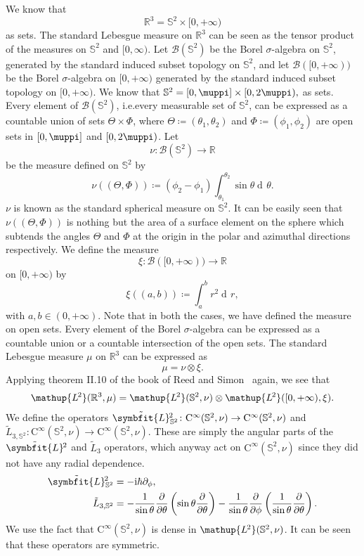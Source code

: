 \documentclass[12pt, a4 paper]{article}
\theoremstyle{definition}
\newcommand{\ltwo}{\mathup{L\kern-0.7pt^2}}
\newcommand{\rthree}{\mathbb{R}^3}
\newcommand{\rr}{\mathbb{R}}
\renewcommand{\i}{\mathrm{i}}
\renewcommand{\pi}{\muppi}
\newcommand{\lvecsquare}{\tilde{\symbfit{L}}\kern-1pt^2}
\newcommand{\der}{\operatorname{d\!}{}}
\begin{document}
	We know that \[\rthree = \mathbb{S}^2 \times [0, +\infty)\] as sets. The standard Lebesgue measure on $\rthree$ can be seen as the tensor product of the measures on $\mathbb{S}^2$ and $[0, \infty)$. Let $\mathcal{B}(\mathbb{S}^2)$ be the Borel $\sigma$-algebra on $\mathbb{S}^2$, generated by the standard induced subset topology on $\mathbb{S}^2$, and let $\mathcal{B}([0,+\infty))$ be the Borel $\sigma$-algebra on $[0, +\infty)$ generated by the standard induced subset topology on $[0, +\infty)$. We know that $\mathbb{S}^2 = [0, \pi] \times [0, 2\pi),$ as sets. Every element of $\mathcal{B}(\mathbb{S}^2)$, i.e.\@ every measurable set of $\mathbb{S}^2$, can be expressed as a countable union of sets $\Theta \times \Phi$, where $\Theta \coloneq (\theta_1, \theta_2)$ and $\Phi \coloneq (\phi_1, \phi_2)$ are open sets in $[0, \pi]$ and $[0, 2\pi)$. Let
	\[
		\nu \colon \mathcal{B}(\mathbb{S}^2) \rightarrow \rr
	\]
	be the measure defined on $\mathbb{S}^2$ by
	\[
	    \nu((\Theta, \Phi)) \coloneq (\phi_2 - \phi_1) \int_{\theta_1}^{\theta_2}\sin{\theta}\der \theta.
	\]
	$\nu$ is known as the standard spherical measure on $\mathbb{S}^2$. It can be easily seen that $\nu((\Theta, \Phi))$ is nothing but the area of a surface element on the sphere which subtends the angles $\Theta$ and $\Phi$ at the origin in the polar and azimuthal directions respectively. We define the measure
	\[
		\xi \colon \mathcal{B}([0, +\infty)) \rightarrow \rr
	\]
	on $[0, +\infty)$ by
	\[
		\xi((a, b)) \coloneq \int_a^b r^2\! \der r,
	\]
	with $a, b \in (0, +\infty)$. Note that in both the cases, we have defined the measure on open sets. Every element of the Borel $\sigma$-algebra can be expressed as a countable union or a countable intersection of the open sets. The standard Lebesgue measure $\mu$ on $\rthree$ can be expressed as
	\[
		\mu = \nu \otimes \xi.
	\]
	Applying theorem II.10 of the book of Reed and Simon~\cite[p.~52]{Reed} again, we see that
	\begin{align}
		\ltwo(\rthree, \mu) = \ltwo(\mathbb{S}^2, \nu) \otimes \ltwo([0, +\infty), \xi).
	\end{align}
	We define the operators $\lvecsquare_{\,\mathbb{S}^2} \colon \mathrm{C}^\infty(\mathbb{S}^2, \nu) \rightarrow \mathrm{C}^\infty(\mathbb{S}^2, \nu)$ and $\tilde{L}_{3, \mathbb{S}^2} \colon \mathrm{C}^\infty(\mathbb{S}^2, \nu) \rightarrow \mathrm{C}^\infty(\mathbb{S}^2, \nu)$. These are simply the angular parts of the $\lvecsquare$ and $\tilde{L}_3$ operators, which anyway act on $\mathrm{C}^\infty(\mathbb{S}^2, \nu)$ since they did not have any radial dependence.
	\begin{align*}
	    \lvecsquare_{\,\mathbb{S}^2} &= -\i\hbar\partial_\phi,\\
		\tilde{L}_{3, \mathbb{S}^2}  &= -\frac{1}{\sin{\theta}}\frac{\partial}{\partial \theta}\left(\sin{\theta}\frac{\partial}{\partial\theta}\right) -\frac{1}{\sin{\theta}}\frac{\partial}{\partial\phi}\left(\frac{1}{\sin{\theta}}\frac{\partial}{\partial\theta}\right).
	\end{align*}
	We use the fact that $\mathrm{C}^\infty(\mathbb{S}^2, \nu)$ is dense in $\ltwo(\mathbb{S}^2, \nu)$. It can be seen that these operators are symmetric.
\end{document}

